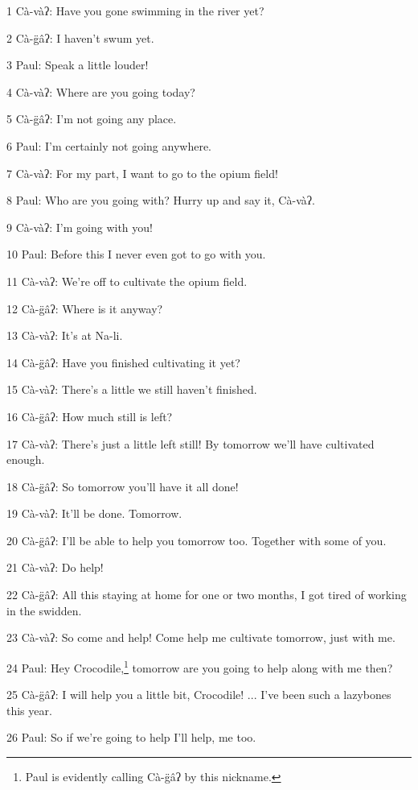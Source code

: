 
1 Cà-vàʔ: Have you gone swimming in the river yet?

2 Cà-g̈âʔ: I haven't swum yet.

3 Paul: Speak a little louder!

4 Cà-vàʔ: Where are you going today?

5 Cà-g̈âʔ: I'm not going any place.

6 Paul: I'm certainly not going anywhere.

7 Cà-vàʔ: For my part, I want to go to the opium field!

8 Paul: Who are you going with? Hurry up and say it, Cà-vàʔ.

9 Cà-vàʔ: I'm going with you!

10 Paul: Before this I never even got to go with you.

11 Cà-vàʔ: We're off to cultivate the opium field.

12 Cà-g̈âʔ: Where is it anyway?

13 Cà-vàʔ: It's at Na-li.

14 Cà-g̈âʔ: Have you finished cultivating it yet?

15 Cà-vàʔ: There's a little we still haven't finished.

16 Cà-g̈âʔ: How much still is left?

17 Cà-vàʔ: There's just a little left still! By tomorrow we'll have cultivated
enough.

18 Cà-g̈âʔ: So tomorrow you'll have it all done!

19 Cà-vàʔ: It'll be done. Tomorrow.

20 Cà-g̈âʔ: I'll be able to help you tomorrow too. Together with some of you.

21 Cà-vàʔ: Do help!

22 Cà-g̈âʔ: All this staying at home for one or two months, I got tired of
working in the swidden.

23 Cà-vàʔ: So come and help! Come help me cultivate tomorrow, just with me.

24 Paul: Hey Crocodile,\footnote{Paul is evidently calling Cà-g̈âʔ by this nickname.} tomorrow are you going to help along with me then?

25 Cà-g̈âʔ: I will help you a little bit, Crocodile! ... I've been such a lazybones
this year.

26 Paul: So if we're going to help I'll help, me too.

